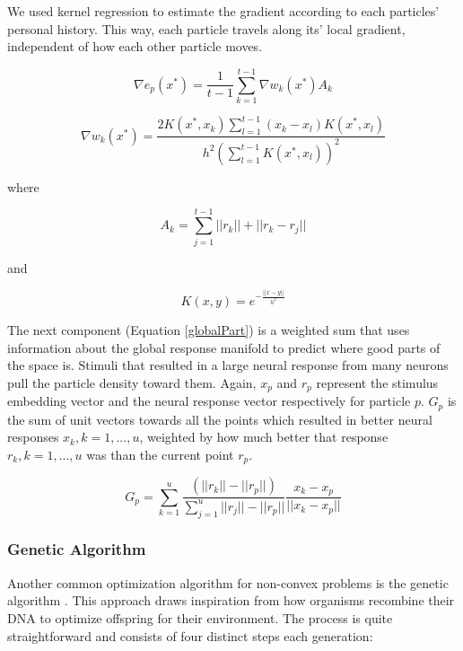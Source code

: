 We used kernel regression to estimate the gradient according to each particles’ personal history. This way, each particle travels along its' local gradient, independent of how each other particle moves. 

\begin{equation}
	\nabla e_p (x^* )=\frac{1}{t-1} \sum_{k=1}^{t-1} \nabla w_k (x^* )  A_k
\end{equation}

\begin{equation}
	\nabla w_k (x^* )=\frac{2K(x^*,x_k) \sum_{l=1}^{t-1} (x_k-x_l)K(x^*,x_l)} {h^2\left(\sum_{l=1}^{t-1}K(x^*, x_l)\right)^2}
\end{equation}

where

\begin{equation}
	A_k = \sum_{j=1}^{t-1}||r_k||+||r_k-r_j||
\end{equation}

and

\begin{equation}
	K(x,y)=e^{- \frac{||x-y||}{h^2}}
\end{equation}

The next component (Equation \ref{globalPart}) is a weighted sum that uses information about the global response manifold to predict where good parts of the space is. Stimuli that resulted in a large neural response from many neurons pull the particle density toward them. Again, $x_p$ and $r_p$ represent the stimulus embedding vector and the neural response vector respectively for particle $p$. $G_p$ is the sum of unit vectors towards all the points which resulted in better neural responses $x_k, k = 1,...,u$, weighted by how much better that response $r_k, k = 1,...,u$ was than the current point $r_p$.

\begin{equation}
	G_p = \sum_{k=1}^{u}\frac{(||r_k||-||r_p||)}{\sum_{j=1}^{u}||r_j||-||r_p||} \frac {x_k-x_p}{||x_k-x_p||}\label{globalPart}
\end{equation}

\subsubsection*{Genetic Algorithm}
Another common optimization algorithm for non-convex problems is the genetic algorithm \parencite{Katoch2021}. This approach draws inspiration from how organisms recombine their DNA to optimize offspring for their environment. The process is quite straightforward and consists of four distinct steps each generation:

